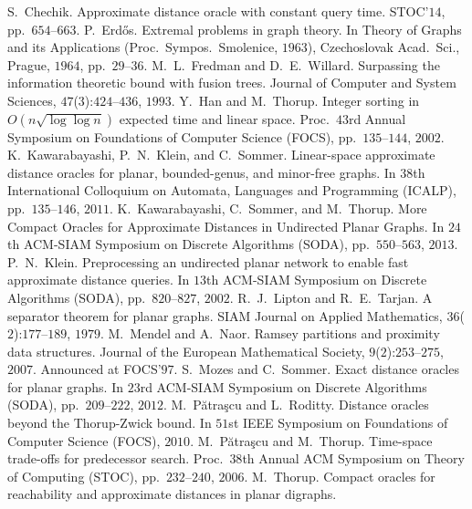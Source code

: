 \documentclass[11pt]{article}
\begin{document}
\begin{thebibliography}{99}
  S.~Chechik.
  Approximate distance oracle with constant query time.
  STOC'$14$, pp.~$654$--$663$.
  P.~Erd\H{o}s.
  Extremal problems in graph theory.
  In Theory of Graphs and its Applications (Proc.~Sympos.~Smolenice, $1963$),
  Czechoslovak Acad.~Sci., Prague, $1964$, pp.~$29$--$36$.
  M.~L.~Fredman and D.~E.~Willard.
  Surpassing the information theoretic bound with fusion trees.
  Journal of Computer and System Sciences, $47$($3$):$424$--$436$, $1993$. 
  Y.~Han and M.~Thorup.
  Integer sorting in $O(n\sqrt{\log\log n})$ expected time and linear space.
  Proc.~$43$rd Annual Symposium on Foundations of Computer Science (FOCS), pp.~$135$--$144$, $2002$.
  K.~Kawarabayashi, P.~N.~Klein, and C.~Sommer.
  Linear-space approximate distance oracles for planar, bounded-genus, and minor-free graphs.
  In $38$th International Colloquium on Automata, Languages and Programming (ICALP), pp.~$135$--$146$, $2011$.
  K.~Kawarabayashi, C.~Sommer, and M.~Thorup.
  More Compact Oracles for Approximate Distances in Undirected Planar Graphs.
  In $24$th ACM-SIAM Symposium on Discrete Algorithms (SODA), pp.~$550$--$563$, $2013$.
  P.~N.~Klein.
  Preprocessing an undirected planar network to enable fast approximate distance queries.
  In $13$th ACM-SIAM Symposium on Discrete Algorithms (SODA), pp.~$820$--$827$, $2002$.
  R.~J.~Lipton and R.~E.~Tarjan.
  A separator theorem for planar graphs.
  SIAM Journal on Applied Mathematics, $36$($2$):$177$--$189$, $1979$.
  M.~Mendel and A.~Naor.
  Ramsey partitions and proximity data structures.
  Journal of the European Mathematical Society, $9$($2$):$253$--$275$, $2007$. Announced at FOCS'$97$.
  S.~Mozes and C.~Sommer.
  Exact distance oracles for planar graphs.
  In $23$rd ACM-SIAM Symposium on Discrete Algorithms (SODA), pp.~$209$--$222$, $2012$.
  M.~P\u{a}tra\c{s}cu and L.~Roditty.
  Distance oracles beyond the Thorup-Zwick bound.
  In $51$st IEEE Symposium on Foundations of Computer Science (FOCS), $2010$.
  M.~P\u{a}tra\c{s}cu and M.~Thorup.
  Time-space trade-offs for predecessor search.
  Proc.~$38$th Annual ACM Symposium on Theory of Computing (STOC), pp.~$232$--$240$, $2006$.
  M.~Thorup.
  Compact oracles for reachability and approximate distances in planar digraphs.

\end{thebibliography}
\end{document}
